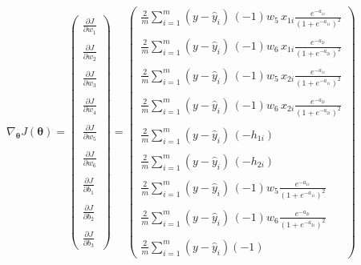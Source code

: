 \documentclass[
  a4paperpaper,
]{article}
\begin{document}
\begin{align}
  \nabla_{\boldsymbol{\theta}}J(\boldsymbol{\theta}) = \begin{pmatrix}
\frac{\partial J}{\partial w_1} \\ \\
\frac{\partial J}{\partial w_2} \\ \\
\frac{\partial J}{\partial w_3} \\ \\
\frac{\partial J}{\partial w_4} \\ \\
\frac{\partial J}{\partial w_5} \\ \\
\frac{\partial J}{\partial w_6} \\ \\
\frac{\partial J}{\partial b_1} \\ \\
\frac{\partial J}{\partial b_2} \\ \\
\frac{\partial J}{\partial b_3} \end{pmatrix} = \begin{pmatrix} 
\frac{2}{m} \sum\limits^m_{i = 1}(y - \hat{y}_i) \, (-1)w_5 \, x_{1i} \frac{e^{-a_{1i}}}{(1+e^{-a_{1i}})^2} \\ \\ 
\frac{2}{m} \sum\limits^m_{i = 1}(y - \hat{y}_i) \, (-1)w_6 \, x_{1i} \frac{e^{-a_{2i}}}{(1+e^{-a_{2i}})^2} \\ \\ 
\frac{2}{m} \sum\limits^m_{i = 1}(y - \hat{y}_i) \, (-1)w_5 \, x_{2i} \frac{e^{-a_{1i}}}{(1+e^{-a_{1i}})^2} \\ \\ 
\frac{2}{m} \sum\limits^m_{i = 1}(y - \hat{y}_i) \, (-1)w_6 \, x_{2i} \frac{e^{-a_{2i}}}{(1+e^{-a_{2i}})^2} \\ \\ 
\frac{2}{m} \sum\limits^m_{i = 1}(y - \hat{y}_i) \, (-h_{1i}) \\ \\ 
\frac{2}{m} \sum\limits^m_{i = 1}(y - \hat{y}_i) \, (-h_{2i}) \\ \\ 
\frac{2}{m} \sum\limits^m_{i = 1}(y - \hat{y}_i) \, (-1)w_5 \frac{e^{-a_{1i}}}{(1+e^{-a_{1i}})^2} \\ \\ 
\frac{2}{m} \sum\limits^m_{i = 1}(y - \hat{y}_i) \, (-1)w_6 \frac{e^{-a_{2i}}}{(1+e^{-a_{2i}})^2} \\ \\ 
\frac{2}{m} \sum\limits^m_{i = 1}(y - \hat{y}_i)(-1)
\end{pmatrix} \label{102}
\end{align}  
\end{document}
